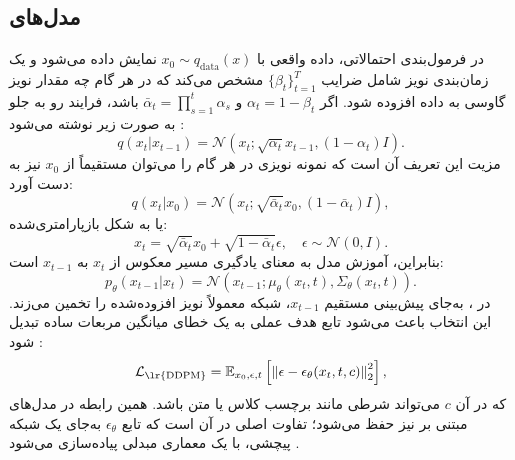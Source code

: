 \subsection{مدل‌های }
در فرمول‌بندی احتمالاتی، داده واقعی با $x_0 \sim q_{\text{data}}(x)$ نمایش داده می‌شود و یک زمان‌بندی نویز شامل ضرایب $\{\beta_t\}_{t=1}^{T}$ مشخص می‌کند که در هر گام چه مقدار نویز گاوسی به داده افزوده شود. اگر $\alpha_t = 1-\beta_t$ و $\bar{\alpha}_t = \prod_{s=1}^{t}\alpha_s$ باشد، فرایند رو به جلو به صورت زیر نوشته می‌شود \cite{sohlDickstein2015deepUnsupervised,ho2020ddpm}:
\begin{equation}
q(x_t|x_{t-1}) = \mathcal{N}\left(x_t; \sqrt{\alpha_t}x_{t-1}, (1-\alpha_t)I\right).
\end{equation}
مزیت این تعریف آن است که نمونه نویزی در هر گام را می‌توان مستقیماً از $x_0$ نیز به دست آورد:
\begin{equation}
q(x_t|x_0) = \mathcal{N}\left(x_t; \sqrt{\bar{\alpha}_t}x_0, (1-\bar{\alpha}_t)I\right),
\end{equation}
یا به شکل بازپارامتری‌شده:
\begin{equation}
x_t = \sqrt{\bar{\alpha}_t}x_0 + \sqrt{1-\bar{\alpha}_t}\epsilon,\quad \epsilon \sim \mathcal{N}(0,I).
\end{equation}
بنابراین، آموزش مدل به معنای یادگیری مسیر معکوس از $x_t$ به $x_{t-1}$ است:
\begin{equation}
p_\theta(x_{t-1}|x_t) = \mathcal{N}\left(x_{t-1}; \mu_\theta(x_t,t), \Sigma_\theta(x_t,t)\right).
\end{equation}
در ، به‌جای پیش‌بینی مستقیم $x_{t-1}$، شبکه معمولاً نویز افزوده‌شده را تخمین می‌زند. این انتخاب باعث می‌شود تابع هدف عملی به یک خطای میانگین مربعات ساده تبدیل شود \cite{ho2020ddpm}:
\begin{equation}
\mathcal{L}_{\text{\lr{DDPM}}} =
\mathbb{E}_{x_0,\epsilon,t}
\left[
\left\|
\epsilon - \epsilon_\theta(x_t,t,c)
\right\|_2^2
\right],
\end{equation}
که در آن $c$ می‌تواند شرطی مانند برچسب کلاس یا متن باشد. همین رابطه در مدل‌های مبتنی بر  نیز حفظ می‌شود؛ تفاوت اصلی در آن است که تابع $\epsilon_\theta$ به‌جای یک شبکه پیچشی، با یک معماری مبدلی پیاده‌سازی می‌شود \cite{2212.09748}.

